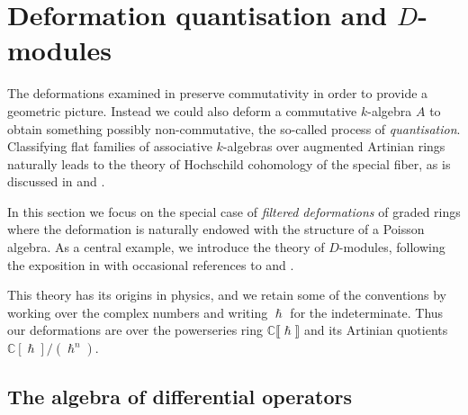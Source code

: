 \section{Deformation quantisation and \texorpdfstring{$D$}{D}-modules}
\label{section-dmodules}

The deformations examined in  preserve
commutativity in order to provide a geometric picture. Instead we could also
deform a commutative \(k\)-algebra \(A\) to obtain something possibly non-commutative,
the so-called process of \textit{quantisation}. Classifying flat families of
associative \(k\)-algebras over augmented Artinian rings naturally leads to the
theory of Hochschild cohomology of the special fiber, as is discussed in
\cite{szendroi_unbearable_1999} and \cite{belmans_hochschild_2018}. 

In this section we focus on the special case of \textit{filtered deformations}
of graded rings where the deformation is naturally endowed with the structure of
a Poisson algebra. As a central example, we introduce the theory of
\(D\)-modules, following the exposition in \cite{hotta2007d} with occasional
references to \cite{ginzburg1998lectures} and \cite{bellamy2016noncommutative}.

This theory has its origins in physics, and we retain some of the conventions by
working over the complex numbers and writing \(\hslash\) for the indeterminate.
Thus our deformations are over the powerseries ring \(\mathbb{C}\llbracket
\hslash \rrbracket\) and its Artinian quotients
\(\mathbb{C}[\hslash]/(\hslash^n)\). 



\subsection{The algebra of differential operators}

